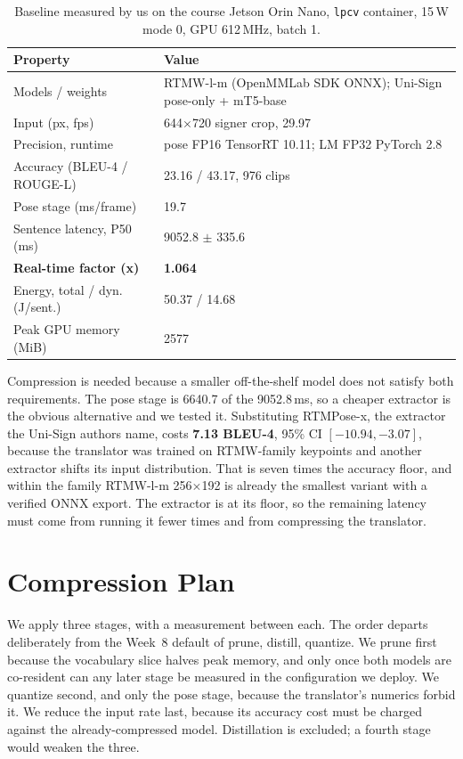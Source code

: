 \documentclass[conference]{IEEEtran}
\begin{document}
\begin{table}[t]
\caption{Baseline measured by us on the course Jetson Orin Nano,
\texttt{lpcv} container, 15\,W mode 0, GPU 612\,MHz, batch 1.}
\label{tab:baseline}
\centering
\scriptsize
\setlength{\tabcolsep}{3pt}
\begin{tabular}{@{}p{}p{}@{}}
\toprule
\textbf{Property} & \textbf{Value} \\
\midrule
Models / weights & RTMW-l-m (OpenMMLab SDK ONNX); Uni-Sign pose-only + mT5-base \\
Input (px, fps) & 644$\times$720 signer crop, 29.97 \\
Precision, runtime & pose FP16 TensorRT 10.11; LM FP32 PyTorch 2.8 \\
Accuracy (BLEU-4 / ROUGE-L) & 23.16 / 43.17, 976 clips \\
Pose stage (ms/frame) & 19.7 \\
Sentence latency, P50 (ms) & 9052.8 $\pm$ 335.6 \\
\textbf{Real-time factor (x)} & \textbf{1.064} \\
Energy, total / dyn. (J/sent.) & 50.37 / 14.68 \\
Peak GPU memory (MiB) & 2577 \\
\bottomrule
\end{tabular}
\end{table}

Compression is needed because a smaller off-the-shelf model does not satisfy both
requirements. The pose stage is 6640.7 of the 9052.8\,ms, so a cheaper extractor is
the obvious alternative and we tested it. Substituting RTMPose-x, the extractor the
Uni-Sign authors name, costs \textbf{7.13 BLEU-4}, 95\% CI $[-10.94, -3.07]$, because
the translator was trained on RTMW-family keypoints and another extractor shifts its
input distribution. That is seven times the accuracy floor, and within the family
RTMW-l-m 256$\times$192 is already the smallest variant with a verified ONNX export.
The extractor is at its floor, so the remaining latency must come from running it
fewer times and from compressing the translator.

\section{Compression Plan}

We apply three stages, with a measurement between each. The order departs
deliberately from the Week~8 default of prune, distill, quantize. We prune first
because the vocabulary slice halves peak memory, and only once both models are
co-resident can any later stage be measured in the configuration we deploy. We
quantize second, and only the pose stage, because the translator's numerics forbid it.
We reduce the input rate last, because its accuracy cost must be charged against the
already-compressed model. Distillation is excluded; a fourth stage would weaken the
three.
\end{document}
